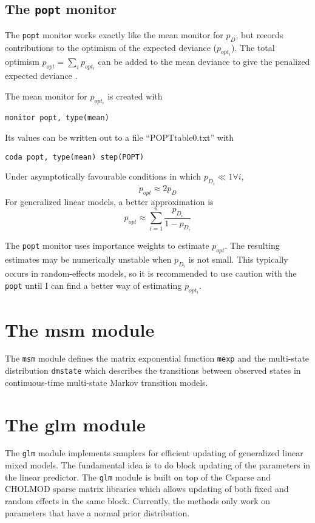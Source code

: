 \documentclass[11pt, a4paper, titlepage]{report}
\begin{document}
\subsection{The \texttt{popt} monitor}

The \verb+popt+ monitor works exactly like the mean monitor for $p_D$,
but records contributions to the optimism of the expected deviance
($p_{opt_i}$). The total optimism $p_{opt} = \sum_i p_{opt_i}$  can be
added to the mean deviance to give the penalized expected deviance
\cite{plummer:2008}.

The mean monitor for $p_{opt_i}$ is created with
\begin{verbatim}
monitor popt, type(mean)
\end{verbatim}
Its values can be written out to a file ``POPTtable0.txt'' with
\begin{verbatim}
coda popt, type(mean) step(POPT)
\end{verbatim}
Under asymptotically favourable conditions in which $p_{D_i} \ll 1
\forall i$,
\[
p_{opt} \approx 2 p_D
\]
For generalized linear models, a better approximation is
\[
p_{opt} \approx \sum_{i=1}^n \frac {p_{D_i}}{1 - p_{D_i}}
\]

The \verb+popt+ monitor uses importance weights to estimate
$p_{opt}$. The resulting estimates may be numerically unstable when
$p_{D_i}$ is not small.  This typically occurs in random-effects
models, so it is recommended to use caution with the \verb+popt+
until I can find a better way of estimating $p_{opt_i}$.

\section{The msm module}

The \verb+msm+ module defines the matrix exponential function
\verb+mexp+ and the multi-state distribution \verb+dmstate+ which
describes the transitions between observed states in continuous-time
multi-state Markov transition models. 

\section{The glm module}

The \verb+glm+ module implements samplers for efficient updating of
generalized linear mixed models.  The fundamental idea is to do block
updating of the parameters in the linear predictor.  The \verb+glm+
module is built on top of the \textsf{Csparse} and \textsf{CHOLMOD}
sparse matrix libraries
\cite{Davis2006, Davis1999} which allows updating of both fixed and random
effects in the same block. Currently, the methods only work on
parameters that have a normal prior distribution.
\end{document}
